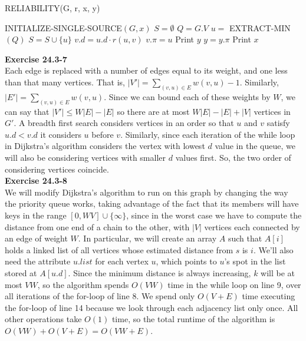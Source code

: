 \documentclass{article}
\begin{document}
\begin{algorithm}
\caption{RELIABILITY(G, r, x, y)}
\begin{algorithmic}[1]
\State INITIALIZE-SINGLE-SOURCE$(G,x)$
\State $S = \emptyset$
\State $Q = G.V$
	\State $u = $ EXTRACT-MIN$(Q)$
	\State $S = S \cup \{u\}$
			\State $v.d = u.d\cdot r(u,v)$
			\State $v.\pi = u$
		\EndIf
	\EndFor
\EndWhile
{}
	\State Print $y$
	\State $y = y.\pi$
\EndWhile
\State Print $x$
\end{algorithmic}
\end{algorithm}


\noindent\textbf{Exercise 24.3-7}\\

Each edge is replaced with a number of edges equal to its weight, and one less than that many vertices. That is, $|V'| = \sum_{(v,u)\in E} w(v,u) -1$. Similarly, $|E'| = \sum_{(v,u)\in E} w(v,u)$. Since we can bound each of these weights by $W$, we can say that $|V'| \le W|E|-|E|$ so there are at most $W|E|-|E|+|V|$ vertices in $G'$. A breadth first search considers vertices in an order so that $u$ and $v$ satisfy $u.d < v.d$ it considers $u$ before $v$. Similarly, since each iteration of the while loop in Dijkstra's algorithm considers the vertex with lowest $d$ value in the queue, we will also be considering vertices with smaller $d$ values first. So, the two order of considering vertices coincide.\\


\noindent\textbf{Exercise 24.3-8}\\

We will modify Dijkstra's algorithm to run on this graph by changing the way the priority queue works, taking advantage of the fact that its members will have keys in the range $[0,WV] \cup \{\infty\}$, since in the worst case we have to compute the distance from one end of a chain to the other, with $|V|$ vertices each connected by an edge of weight $W$. In particular, we will create an array $A$ such that $A[i]$ holds a linked list of all vertices whose estimated distance from $s$ is $i$.  We'll also need the attribute $u.list$ for each vertex $u$, which points to $u$'s spot in the list stored at $A[u.d]$.  Since the minimum distance is always increasing, $k$ will be at most $VW$, so the algorithm spends $O(VW)$ time in the while loop on line 9, over all iterations of the for-loop of line 8.  We spend only $O(V+E)$ time executing the for-loop of line 14 because we look through each adjacency list only once.  All other operations take $O(1)$ time, so the total runtime of the algorithm is $O(VW) + O(V + E) = O(VW + E)$.  \\
\end{document}
